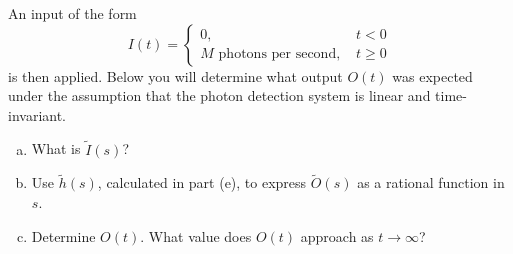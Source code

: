 \documentclass{article}
\begin{document}
An input of the form
\[ I(t) = \left\{
     \begin{array}{lr}
       0, & t < 0 \\
      M \textrm{ photons per second, } & t \geq 0
     \end{array}
   \right. \]      
is then applied. Below you will determine what output $O(t)$ was expected under the assumption that the photon detection system is linear and time-invariant.
\begin{enumerate}[a)]  
\setlength{\itemsep}{0pt}
\setcounter{enumi}{4}
\item What is $\tilde{I}(s)$?
\item Use $\tilde{h}(s)$, calculated in part (e), to express $\tilde{O}(s)$ as a rational function in $s$.
\item Determine $O(t)$. What value does $O(t)$ approach as $t \to \infty$?
\end{enumerate}
\end{document}
